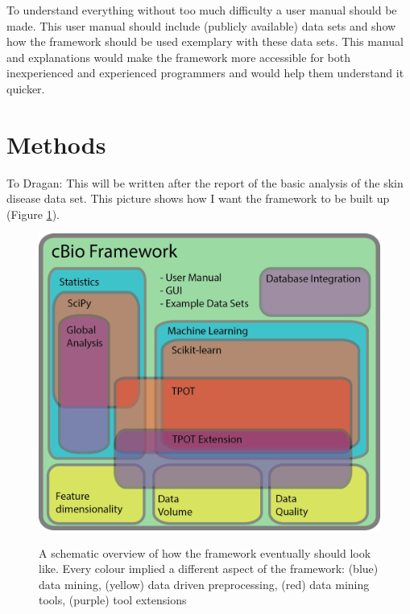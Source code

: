 \documentclass[10pt,a4paper]{article}
\begin{document}
	To understand everything without too much difficulty a user manual should be made. This user manual should include (publicly available) data sets and show how the framework should be used exemplary with these data sets. This manual and explanations would make the framework more accessible for both inexperienced and experienced programmers and would help them understand it quicker.
	
	\section{Methods}
	\label{sec: Methods}
	
	To Dragan: This will be written after the report of the basic analysis of the skin disease data set. This picture shows how I want the framework to be built up (Figure \ref{fig:FrameworkImage}).	
	
	\begin{figure}
		\includegraphics[scale=1.0]{FrameworkImage.png}
		\label{fig:FrameworkImage}
		\caption{A schematic overview of how the framework eventually should look like. Every colour implied a different aspect of the framework: (blue) data mining, (yellow) data driven preprocessing, (red) data mining tools, (purple) tool extensions}
	\end{figure}
	
	 
	
	
	\appendix
	
\end{document}
